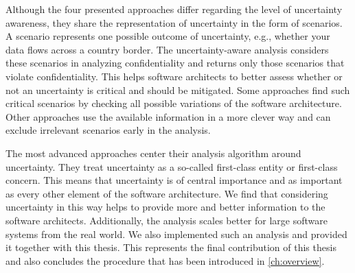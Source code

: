 Although the four presented approaches differ regarding the level of uncertainty awareness, they share the representation of uncertainty in the form of scenarios.
A scenario represents one possible outcome of uncertainty, e.g., whether your data flows across a country border.
The uncertainty-aware analysis considers these scenarios in analyzing confidentiality and returns only those scenarios that violate confidentiality.
This helps software architects to better assess whether or not an uncertainty is critical and should be mitigated.
Some approaches find such critical scenarios by checking all possible variations of the software architecture.
Other approaches use the available information in a more clever way and can exclude irrelevant scenarios early in the analysis.

The most advanced approaches center their analysis algorithm around uncertainty.
They treat uncertainty as a so-called first-class entity or first-class concern.
This means that uncertainty is of central importance and as important as every other element of the software architecture.
We find that considering uncertainty in this way helps to provide more and better information to the software architects.
Additionally, the analysis scales better for large software systems from the real world.
We also implemented such an analysis and provided it together with this thesis.
This represents the final contribution of this thesis and also concludes the procedure that has been introduced in \autoref{ch:overview}.

